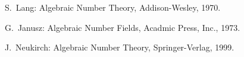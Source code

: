 \documentclass{amsart}
\theoremstyle{definition}
\theoremstyle{remark}
\begin{document}
\begin{thebibliography}{00}

S.~Lang: Algebraic Number Theory, Addison-Wesley, 1970.

G.~Janusz: Algebraic Number Fields, Acadmic Press, Inc., 1973.

J.~Neukirch: Algebraic Number Theory, Springer-Verlag, 1999.

\end{thebibliography}
\end{document}
